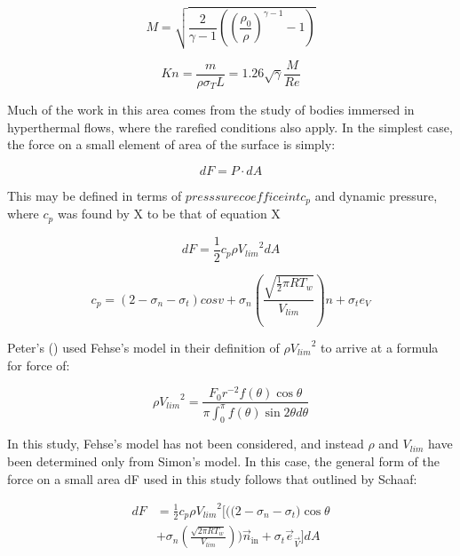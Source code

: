\documentclass[journal]{new-aiaa}
\begin{document}
\begin{equation}
    M = \sqrt{\frac{2}{\gamma - 1}\left( \left( \frac{\rho_0}{\rho} \right)^{\gamma -1} -1 \right) }
\end{equation}

\begin{equation}
    Kn = \frac{m}{\rho \sigma_T L} = 1.26 \sqrt{\gamma} \frac{M}{Re}
\end{equation}



Much of the work in this area comes from the study of bodies immersed in hyperthermal flows, where the rarefied conditions also apply. In the simplest case, the force on a small element of area of the surface is simply:

\begin{equation}
    dF = P \cdot dA
\end{equation}

This may be defined in terms of $presssure coefficeint c_p$ and dynamic pressure, where $c_p$ was found by X to be that of equation X

\begin{equation}
    dF = \frac{1}{2} c_p \rho {V_{lim}}^2 dA
\end{equation}

\begin{equation}
    c_p = \left( 2 - \sigma_n - \sigma_t \right) cos{v} + \sigma_n \left( \frac{\sqrt{\frac{1}{2} \pi R T_w}}{V_{lim}} \right)n + \sigma_t e_V
\end{equation}


Peter's (\cite{petersCOBRAContactlessDetumbling2016}) used Fehse's model in their definition of $\rho {V_{lim}}^2$ to arrive at a formula for force of:

\begin{equation}
        \rho {V_{lim}}^2 =  \frac{F_0 r^{-2} f \left( \theta \right) \cos{\theta}}{\pi \int_{0}^{\pi} f\left( \theta \right) \sin{2\theta} d\theta} 
\end{equation}

In this study, Fehse's model has not been considered, and instead $\rho$ and $V_{lim}$ have been determined only from Simon's model. In this case, the general form of the force on a small area dF used in this study follows that outlined by Schaaf:

\begin{equation}
\begin{aligned}
 dF &=  \frac{1}{2} c_p \rho {V_{lim}}^2  \bigg[  \bigg( \big( 2 - \sigma_n - \sigma_t \big) \cos{\theta} \\
    & + \sigma_n \left( \frac{\sqrt{2 \pi R T_w}}{V_{lim}} \right) \bigg) \vec{n}_{\text{in}} + \sigma_t \vec{e}_{\vec{V}} \bigg] dA
\end{aligned}
\end{equation}
\end{document}
